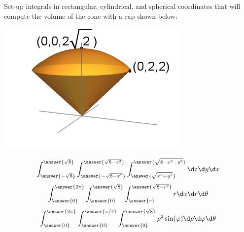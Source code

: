 \documentclass{ximera}
\author{Bart Snapp}
\begin{document}
\begin{exercise}
  Set-up integrals in rectangular, cylindrical, and spherical
  coordinates that will compute the volume of the cone with a cap shown below:
  \begin{image}
    \includegraphics{coneWithCap1.png}
  \end{image}
  \begin{prompt}
  \[
  \int_{\answer{-\sqrt{8}}}^{\answer{\sqrt{8}}}\int_{\answer{-\sqrt{8-x^2}}}^{\answer{\sqrt{8-x^2}}}\int_{\answer{\sqrt{x^2+y^2}}}^{\answer{\sqrt{8-x^2-y^2}}}\d z \d y \d x
  \]
  \[
  \int_{\answer{0}}^{\answer{2\pi}}\int_{\answer{0}}^{\answer{\sqrt{8}}}\int_{\answer{r}}^{\answer{\sqrt{8-r^2}}}   r\d z \d r \d \theta
  \]
  \[
  \int_{\answer{0}}^{\answer{2\pi}}\int_{\answer{0}}^{\answer{\pi/4}}\int_{\answer{0}}^{\answer{\sqrt{8}}}   \rho^2\sin(\varphi)\d \rho \d \varphi \d \theta
  \]
  \end{prompt}
\end{exercise}
\end{document}
